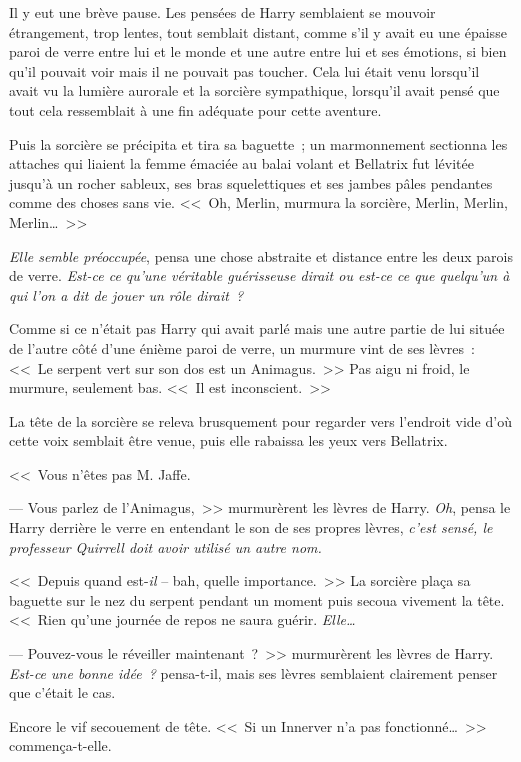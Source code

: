 Il y eut une brève pause. Les pensées de Harry semblaient se mouvoir étrangement, trop lentes, tout semblait distant, comme s'il y avait eu une épaisse paroi de verre entre lui et le monde et une autre entre lui et ses émotions, si bien qu'il pouvait voir mais il ne pouvait pas toucher. Cela lui était venu lorsqu'il avait vu la lumière aurorale et la sorcière sympathique, lorsqu'il avait pensé que tout cela ressemblait à une fin adéquate pour cette aventure.

Puis la sorcière se précipita et tira sa baguette~; un marmonnement sectionna les attaches qui liaient la femme émaciée au balai volant et Bellatrix fut lévitée jusqu'à un rocher sableux, ses bras squelettiques et ses jambes pâles pendantes comme des choses sans vie. <<~Oh, Merlin, murmura la sorcière, Merlin, Merlin, Merlin…~>>

\emph{Elle semble préoccupée}, pensa une chose abstraite et distance entre les deux parois de verre. \emph{Est-ce ce qu'une véritable guérisseuse dirait ou est-ce ce que quelqu'un à qui l'on a dit de jouer un rôle dirait~?}

Comme si ce n'était pas Harry qui avait parlé mais une autre partie de lui située de l'autre côté d'une énième paroi de verre, un murmure vint de ses lèvres~: <<~Le serpent vert sur son dos est un Animagus.~>> Pas aigu ni froid, le murmure, seulement bas. <<~Il est inconscient.~>>

La tête de la sorcière se releva brusquement pour regarder vers l'endroit vide d'où cette voix semblait être venue, puis elle rabaissa les yeux vers Bellatrix.

<<~Vous n'êtes pas M. Jaffe.

--- Vous parlez de l'Animagus,~>> murmurèrent les lèvres de Harry. \emph{Oh}, pensa le Harry derrière le verre en entendant le son de ses propres lèvres, \emph{c'est sensé, le professeur Quirrell doit avoir utilisé un autre nom.}

<<~Depuis quand est-\emph{il} -- bah, quelle importance.~>> La sorcière plaça sa baguette sur le nez du serpent pendant un moment puis secoua vivement la tête. <<~Rien qu'une journée de repos ne saura guérir. \emph{Elle…}

--- Pouvez-vous le réveiller maintenant~?~>> murmurèrent les lèvres de Harry. \emph{Est-ce une bonne idée~?} pensa-t-il, mais ses lèvres semblaient clairement penser que c'était le cas.

Encore le vif secouement de tête. <<~Si un Innerver n'a pas fonctionné…~>> commença-t-elle.

